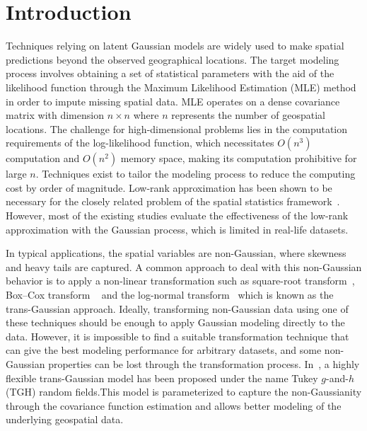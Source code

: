 \documentclass[conference]{IEEEtran}
\begin{document}
\section{Introduction}



Techniques relying on latent Gaussian models are widely used to make spatial predictions beyond the observed geographical locations. The target modeling
process involves obtaining a set of statistical parameters
with the aid of the likelihood function through  the Maximum Likelihood Estimation (MLE) method in order to impute missing spatial data.  MLE 
operates on a dense covariance matrix with dimension $n \times n$ where $n$ represents the number of geospatial locations. The challenge for high-dimensional problems lies in the
computation requirements of the log-likelihood function, which necessitates $O(n^3)$ computation and $O(n^2)$ memory space, making its computation prohibitive for large $n$. Techniques exist to tailor  the modeling process to reduce the	 computing cost by order of magnitude. Low-rank approximation has been shown to be necessary for the
closely related problem of the spatial statistics framework~\cite{cressie2008fixed, eidsvik2012approximate, stein2013stochastic, abdulah2018parallel}. However, most of the existing  studies evaluate the effectiveness of the low-rank approximation with the Gaussian process, which is limited in real-life datasets.

In typical applications, the spatial variables are non-Gaussian, where skewness
and heavy tails are captured. A common approach 
to deal with this non-Gaussian behavior is to apply a  non-linear transformation such as 
square-root transform~\cite{berrocal2010bivariate,yao2015fault,yan2019non}, Box–Cox transform ~\cite{de1997bayesian} and the log-normal 
transform~\cite{rios2018learning} which is known as the trans-Gaussian approach. Ideally, transforming non-Gaussian 
data using one of these techniques should be 
enough to apply Gaussian modeling directly to the data. However, it is impossible to find a suitable transformation technique 
that can give the best modeling performance for arbitrary datasets, and some non-Gaussian properties can be lost through the transformation 
process. In~\cite{xu2017tukey}, a highly flexible trans-Gaussian model has been proposed under the name Tukey $g$-and-$h$ (TGH) random
fields.This model is parameterized to capture the non-Gaussianity  through the covariance function estimation and allows better modeling of the underlying geospatial data.
\end{document}
